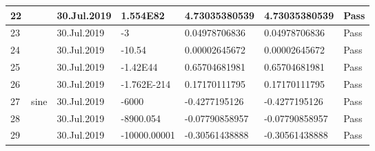 \documentclass[15pt]{article}
\begin{document}
\begin{CJK*}{UTF8}{gbsn}
{\begin{table}[!htp]
\begin{tabular}{@{}|l|l|l|l|l|l|l|@{}}
22                       &                                  & 30.Jul.2019                    & 1.554E82                   & 4.73035380539                        & 4.73035380539                      & Pass                                                                             \\ \midrule
23                       &                                  & 30.Jul.2019                    & -3                         & 0.04978706836                        & 0.04978706836                      & Pass                                                                             \\ \midrule
24                       &                                  & 30.Jul.2019                    & -10.54                     & 0.00002645672                        & 0.00002645672                      & Pass                                                                             \\ \midrule
25                       &                                  & 30.Jul.2019                    & -1.42E44                   & 0.65704681981                        & 0.65704681981                      & Pass                                                                             \\ \midrule
26                       &                                  & 30.Jul.2019                    & -1.762E-214                & 0.17170111795                        & 0.17170111795                      & Pass                                                                             \\ \midrule
27                       & sine                             & 30.Jul.2019                    & -6000                      & -0.4277195126                        & -0.4277195126                      & Pass                                                                             \\ \midrule
28                       &                                  & 30.Jul.2019                    & -8900.054                  & -0.07790858957                       & -0.07790858957                     & Pass                                                                             \\ \midrule
29                       &                                  & 30.Jul.2019                    & -10000.00001               & -0.30561438888                       & -0.30561438888                     & Pass                                                                             \\ \midrule

\end{tabular}
\end{table}}
\end{CJK*}
\end{document}

